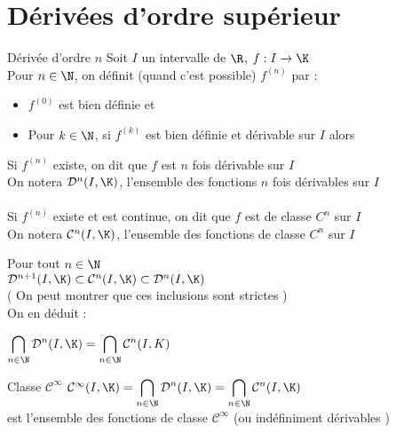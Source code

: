 \documentclass[12pt,a4paper]{report}
\begin{document}
\section{Dérivées d'ordre supérieur}
\begin{definition}{Dérivée d'ordre $n$}{}
Soit $I$ un intervalle de $\R$, $f:I\to \K$\\
Pour $n\in \N$, on définit (quand c'est possible) $f^{(n)}$ par :
\begin{itemize}
    \item $f^{(0)}$ est bien définie et 
    \item Pour $k\in \N$, si $f^{(k)}$ est bien définie et dérivable sur $I$ alors \\
\end{itemize}
Si $f^{(n)}$ existe, on dit que $f$ est $n$ fois dérivable sur $I$\\
On notera $\mathcal{D}^n (I,\K)$, l'ensemble des fonctions $n$ fois dérivables sur $I$\\
\\
Si $f^{(n)}$ existe et est continue, on dit que $f$ est de classe $C^n$ sur $I$\\
On notera $\mathcal{C}^n (I,\K)$, l'ensemble des fonctions de classe $C^n$ sur $I$
\end{definition}

\begin{remarque}
Pour tout $n \in \N$\\
$\mathcal{D}^{n+1}(I,\K) \subset \mathcal{C}^{n}(I,\K) \subset \mathcal{D}^{n}(I,\K)$\\
( On peut montrer que ces inclusions sont strictes )\\
On en déduit : 
\begin{center}
    $\displaystyle\bigcap_{n \in \N} \mathcal{D}^{n}(I,\K) = \displaystyle\bigcap_{n \in \N} \mathcal{C}^{n}(I,K)$
\end{center}
\end{remarque}

\begin{definition}{Classe $\mathcal{C}^{\infty}$}{}
$\mathcal{C}^{\infty} (I,\K) = \displaystyle\bigcap_{n \in \N} \mathcal{D}^{n}(I,\K) = \displaystyle\bigcap_{n \in \N} \mathcal{C}^{n}(I,\K)$\\
est l'ensemble des fonctions de classe $\mathcal{C}^{\infty}$ (ou indéfiniment dérivables )
\end{definition}
\end{document}
